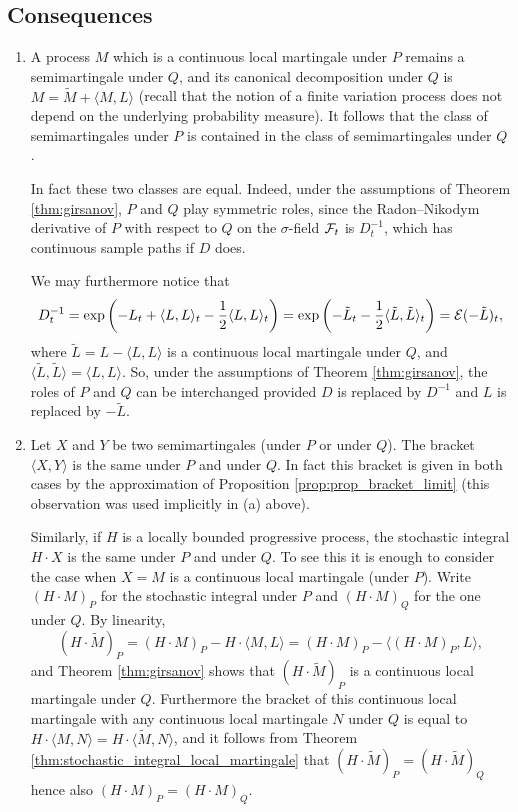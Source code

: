 \documentclass[../Main.tex]{subfiles}
\begin{document}
\subsection*{Consequences}
\begin{enumerate}
\item A process $M$ which is a continuous local martingale under $P$ remains a semimartingale under $Q$, and its canonical decomposition under $Q$ is $M = \tilde{M} + \langle M, L \rangle$ (recall that the notion of a finite variation process does not depend on the underlying probability measure). It follows that the class of semimartingales under $P$ is contained in the class of semimartingales under $Q$.

In fact these two classes are equal. Indeed, under the assumptions of Theorem \ref{thm:girsanov}, $P$ and $Q$ play symmetric roles, since the Radon--Nikodym derivative of $P$ with respect to $Q$ on the $\sigma$-field $\mathcal{F}_t$ is $D_t^{-1}$, which has continuous sample paths if $D$ does.

We may furthermore notice that
$$
D_t^{-1} = \exp\left(-L_t + \langle L, L \rangle_t - \frac{1}{2}\langle L, L \rangle_t\right) = \exp\left(-\tilde{L}_t - \frac{1}{2}\langle \tilde{L}, \tilde{L} \rangle_t\right) = \mathcal{E}(-\tilde{L})_t,
$$
where $\tilde{L} = L - \langle L, L \rangle$ is a continuous local martingale under $Q$, and $\langle \tilde{L}, \tilde{L} \rangle = \langle L, L \rangle$. So, under the assumptions of Theorem \ref{thm:girsanov}, the roles of $P$ and $Q$ can be interchanged provided $D$ is replaced by $D^{-1}$ and $L$ is replaced by $-\tilde{L}$.

\item Let $X$ and $Y$ be two semimartingales (under $P$ or under $Q$). The bracket $\langle X, Y \rangle$ is the same under $P$ and under $Q$. In fact this bracket is given in both cases by the approximation of Proposition \ref{prop:prop_bracket_limit} (this observation was used implicitly in (a) above).

Similarly, if $H$ is a locally bounded progressive process, the stochastic integral $H \cdot X$ is the same under $P$ and under $Q$. To see this it is enough to consider the case when $X = M$ is a continuous local martingale (under $P$). Write $(H \cdot M)_P$ for the stochastic integral under $P$ and $(H \cdot M)_Q$ for the one under $Q$. By linearity,
$$
(H \cdot \tilde{M})_P = (H \cdot M)_P - H \cdot \langle M, L \rangle = (H \cdot M)_P - \langle (H \cdot M)_P, L \rangle,
$$
and Theorem \ref{thm:girsanov} shows that $(H \cdot \tilde{M})_P$ is a continuous local martingale under $Q$. Furthermore the bracket of this continuous local martingale with any continuous local martingale $N$ under $Q$ is equal to $H \cdot \langle M, N \rangle = H \cdot \langle \tilde{M}, N \rangle$, and it follows from Theorem \ref{thm:stochastic_integral_local_martingale} that $(H \cdot \tilde{M})_P = (H \cdot \tilde{M})_Q$ hence also $(H \cdot M)_P = (H \cdot M)_Q$.


\end{enumerate}
\end{document}
